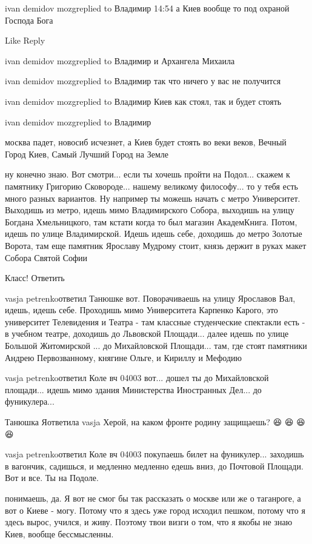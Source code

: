  
 
 
 
 

ivan demidov mozgreplied to Владимир
14:54
а Киев вообще то под охраной Господа Бога

    Like
    Reply

ivan demidov mozgreplied to Владимир
и Архангела Михаила

ivan demidov mozgreplied to Владимир
так что ничего у вас не получится

ivan demidov mozgreplied to Владимир
Киев как стоял, так и будет стоять

ivan demidov mozgreplied to Владимир

москва падет, новосиб исчезнет, а Киев будет стоять во веки веков, Вечный Город
Киев, Самый Лучший Город на Земле


ну конечно знаю. Вот смотри... если ты хочешь пройти на Подол... скажем к памятнику Григорию Сковороде... нашему великому философу... то у тебя есть много разных вариантов. Ну например ты можешь начать с метро Университет. Выходишь из метро, идешь мимо Владимирского Собора, выходишь на улицу Богдана Хмельницкого, там кстати когда то был магазин АкадемКнига. Потом, идешь по улице Владимирской. Идешь идешь себе, доходишь до метро Золотые Ворота, там еще памятник Ярославу Мудрому стоит, князь держит в руках макет Собора Святой Софии

    Класс!
    Ответить

vasja petrenkoответил Танюшке
вот. Поворачиваешь на улицу Ярославов Вал, идешь, идешь себе. Проходишь мимо Университета Карпенко Карого, это университет Телевидения и Театра - там классные студенческие спектакли есть - в учебном театре, доходишь до Львовской Площади... далее идешь по улице Большой Житомирской ... до Михайловской Площади... там, где стоят памятники Андрею Первозванному, княгине Ольге, и Кириллу и Мефодию

vasja petrenkoответил Коле вч 04003
вот... дошел ты до Михайловской площади... идешь мимо здания Министерства Иностранных Дел... до фуникулера...

Танюшка Яответила vasja
Херой, на каком фронте родину защищаешь? 😆 😆 😆 😆

vasja petrenkoответил Коле вч 04003
покупаешь билет на фуникулер... заходишь в вагончик, садишься, и медленно медленно едешь вниз, до Почтовой Площади. Вот и все. Ты на Подоле.

понимаешь, да. Я вот не смог бы так рассказать о москве или же о таганроге, а
вот о Киеве - могу. Потому что я здесь уже город исходил пешком, потому что я
здесь вырос, учился, и живу. Поэтому твои визги о том, что я якобы не знаю
Киев, вообще бессмысленны.
